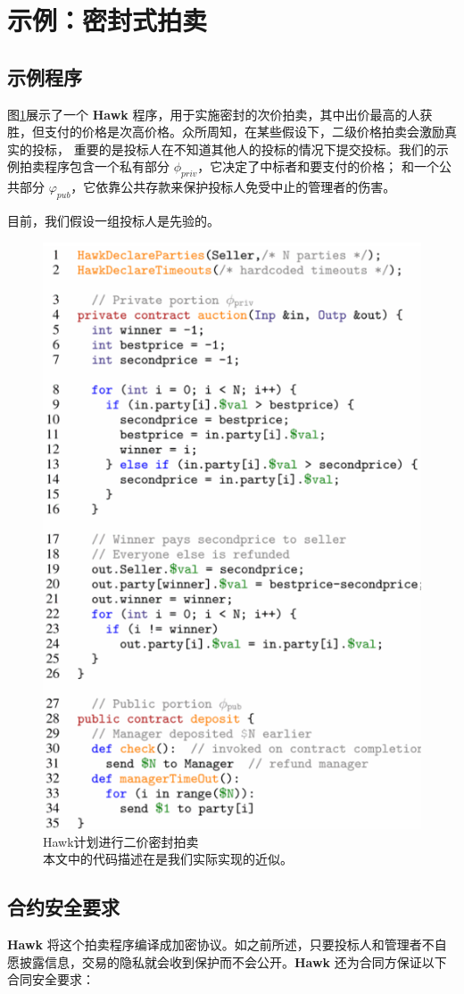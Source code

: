 \documentclass{xduugtrans}
\begin{document}
\section{示例：密封式拍卖}

\subsection{示例程序}

图\ref{fig2}展示了一个 \textbf{Hawk} 程序，用于实施密封的次价拍卖，其中出价最高的人获胜，但支付的价格是次高价格。众所周知，在某些假设下，二级价格拍卖会激励真实的投标，\cite{ref55} 重要的是投标人在不知道其他人的投标的情况下提交投标。我们的示例拍卖程序包含一个私有部分 $\phi _{priv}$，它决定了中标者和要支付的价格； 和一个公共部分 $\varphi  _{pub}$，它依靠公共存款来保护投标人免受中止的管理者的伤害。

目前，我们假设一组投标人是先验的。

\begin{figure}
    \centering
    \includegraphics[width=.4\linewidth]{2}
    \caption{Hawk计划进行二价密封拍卖 \\ 本文中的代码描述在是我们实际实现的近似。}
    \label{fig2}
\end{figure}

\subsection{合约安全要求}

\textbf{Hawk} 将这个拍卖程序编译成加密协议。如之前所述，只要投标人和管理者不自愿披露信息，交易的隐私就会收到保护而不会公开。\textbf{Hawk} 还为合同方保证以下合同安全要求：
\end{document}
